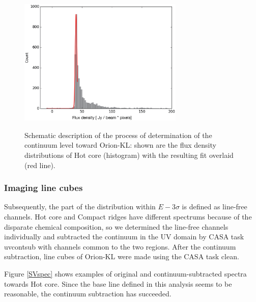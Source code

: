 \begin{figure}[hbp] 
\centering
\vspace{-0.5cm}
\includegraphics[width=0.7\textwidth]{OrionKL/ex_histogram_fit.eps}
\label{fig:histo}
\vspace{-1.5cm}
\caption{Schematic description of the process of determination of the continuum level toward Orion-KL: 
shown are the flux density distributions of Hot core (histogram) with the resulting fit overlaid (red line).}
\end{figure}

\newpage

\subsubsection*{Imaging line cubes}
Subsequently, the part of the distribution within $E - 3\sigma$ is defined as line-free channels.
Hot core and Compact ridges have different spectrums because of the disparate chemical composition, 
so we determined the line-free channels individually and subtracted the continuum
in the UV domain by CASA task {\sc uvcontsub} with channels common to the two regions.
After the continuum subtraction, line cubes of Orion-KL were made using the CASA task {\sc clean}.

Figure \ref{SVspec} shows examples of original and continuum-subtracted spectra towards Hot core. 
Since the base line defined in this analysis seems to be reasonable, the continuum subtraction has succeeded.

